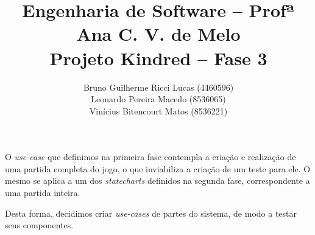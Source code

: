 \documentclass{article}
\title{
    Engenharia de Software -- Profª Ana C. V. de Melo\\
    Projeto Kindred -- Fase 3
}
\author{
    Bruno Guilherme Ricci Lucas (4460596)\\
    Leonardo Pereira Macedo (8536065)\\
    Vinícius Bitencourt Matos (8536221)
}
\begin{document}
\maketitle

O \emph{use-case} que definimos na primeira fase contempla a criação e realização de
uma partida completa do jogo, o que inviabiliza a criação de um teste para ele. O
mesmo se aplica a um dos \emph{statecharts} definidos na segunda fase, correspondente
a uma partida inteira.

Desta forma, decidimos criar \emph{use-cases} de partes do sistema, de modo a testar
seus componentes.





\end{document}
